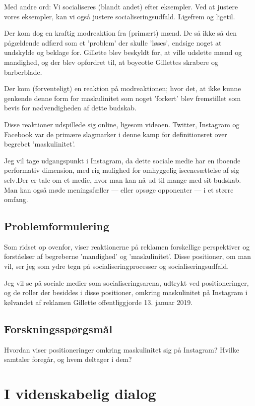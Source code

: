 Med andre ord: Vi socialiseres (blandt andet) efter eksempler. Ved
at justere vores eksempler, kan vi også justere
socialiseringsudfald. Ligefrem og ligetil.

Der kom dog en kraftig modreaktion fra (primært) mænd.
De så ikke så den pågældende adfærd som et 'problem' der skulle
'løses', endsige noget at undskylde og beklage for. Gillette blev
beskyldt for, at ville udslette mænd og mandighed, og der blev
opfordret til, at boycotte Gillettes skrabere og barberblade. 

Der kom (forventeligt) en reaktion på modreaktionen; hvor det, at
ikke kunne genkende denne form for maskulinitet som noget
'forkert' blev fremstillet som bevis for nødvendigheden af dette
budskab. 

Disse reaktioner udspillede sig online, ligesom videoen. Twitter,
Instagram og Facebook var de primære slagmarker i denne kamp for
definitionsret over begrebet 'maskulinitet'.

Jeg vil tage udgangspunkt i Instagram, da dette sociale medie har
en iboende performativ dimension, med rig mulighed for omhyggelig
iscenesættelse af sig selv.Der er tale om et medie, hvor man kan
nå ud til mange med sit budskab. Man kan også møde meningsfæller —
eller opsøge opponenter — i et større omfang.

\subsection{Problemformulering}

Som ridset op ovenfor, viser reaktionerne på reklamen forskellige
perspektiver og forståelser af begreberne 'mandighed' og
'maskulinitet'. Disse positioner, om man vil, ser jeg som ydre
tegn på socialiseringprocesser og socialiseringsudfald. 

Jeg vil se på sociale medier som socialiseringsarena, udtrykt ved
positioneringer, og  de roller der besiddes i disse positioner, 
omkring maskulinitet på Instagram i kølvandet af
reklamen Gillette offentliggjorde 13. januar 2019. 

\subsection{Forskningsspørgsmål}
Hvordan viser positioneringer omkring maskulinitet sig på 
Instagram? Hvilke samtaler foregår, og hvem deltager i dem?

\section{I videnskabelig dialog}

